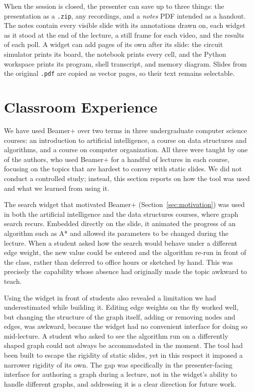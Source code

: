\documentclass[sigconf]{acmart}
\begin{document}
When the session is closed, the presenter can save up to three things: the presentation as a \texttt{.zip}, any recordings, and a \emph{notes} PDF intended as a handout. The notes contain every visible slide with its annotations drawn on, each widget as it stood at the end of the lecture, a still frame for each video, and the results of each poll. A widget can add pages of its own after its slide: the circuit simulator prints its board, the notebook prints every cell, and the Python workspace prints its program, shell transcript, and memory diagram. Slides from the original \texttt{.pdf} are copied as vector pages, so their text remains selectable.

\section{Classroom Experience}
\label{sec:experience}
We have used Beamer+ over two terms in three undergraduate computer science courses: an introduction to artificial intelligence, a course on data structures and algorithms, and a course on computer organization. All three were taught by one of the authors, who used Beamer+ for a handful of lectures in each course, focusing on the topics that are hardest to convey with static slides. We did not conduct a controlled study; instead, this section reports on how the tool was used and what we learned from using it.

The search widget that motivated Beamer+ (Section~\ref{sec:motivation}) was used in both the artificial intelligence and the data structures courses, where graph search recurs. Embedded directly on the slide, it animated the progress of an algorithm such as A* and allowed its parameters to be changed during the lecture. When a student asked how the search would behave under a different edge weight, the new value could be entered and the algorithm re-run in front of the class, rather than deferred to office hours or sketched by hand. This was precisely the capability whose absence had originally made the topic awkward to teach.

Using the widget in front of students also revealed a limitation we had underestimated while building it. Editing edge weights on the fly worked well, but changing the structure of the graph itself, adding or removing nodes and edges, was awkward, because the widget had no convenient interface for doing so mid-lecture. A student who asked to see the algorithm run on a differently shaped graph could not always be accommodated in the moment. The tool had been built to escape the rigidity of static slides, yet in this respect it imposed a narrower rigidity of its own. The gap was specifically in the presenter-facing interface for authoring a graph during a lecture, not in the widget's ability to handle different graphs, and addressing it is a clear direction for future work.
\end{document}
